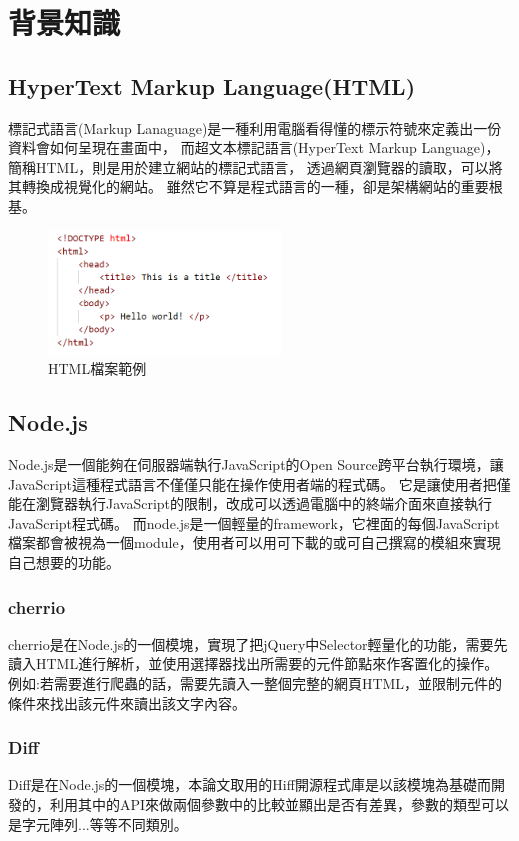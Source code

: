 \chapter{背景知識}

\section{HyperText Markup Language(HTML)}\label{s2.1}
\indent
標記式語言(Markup Lanaguage)是一種利用電腦看得懂的標示符號來定義出一份資料會如何呈現在畫面中，
而超文本標記語言(HyperText Markup Language)，簡稱HTML，則是用於建立網站的標記式語言，
透過網頁瀏覽器的讀取，可以將其轉換成視覺化的網站。
雖然它不算是程式語言的一種，卻是架構網站的重要根基。

\begin{figure}[H]
    \centering
    \includegraphics[width=0.55\textwidth]{picture/ch2-htmlExample.png}
    \caption{HTML檔案範例}
    \label{f2.1}
\end{figure}

\section{Node.js}\label{s2.2}
Node.js是一個能夠在伺服器端執行JavaScript的Open Source跨平台執行環境，讓JavaScript這種程式語言不僅僅只能在操作使用者端的程式碼。
它是讓使用者把僅能在瀏覽器執行JavaScript的限制，改成可以透過電腦中的終端介面來直接執行JavaScript程式碼。
而node.js是一個輕量的framework，它裡面的每個JavaScript檔案都會被視為一個module，使用者可以用可下載的或可自己撰寫的模組來實現自己想要的功能。

\subsection{cherrio}\label{s2.2.1}
cherrio是在Node.js的一個模塊，實現了把jQuery中Selector輕量化的功能，需要先讀入HTML進行解析，並使用選擇器找出所需要的元件節點來作客置化的操作。
例如:若需要進行爬蟲的話，需要先讀入一整個完整的網頁HTML，並限制元件的條件來找出該元件來讀出該文字內容。

\subsection{Diff}\label{s2.2.2}
Diff是在Node.js的一個模塊，本論文取用的Hiff開源程式庫是以該模塊為基礎而開發的，利用其中的API來做兩個參數中的比較並顯出是否有差異，參數的類型可以是字元陣列...等等不同類別。

